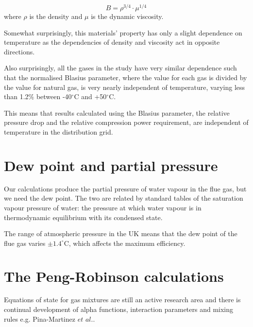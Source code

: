 \documentclass[5p]{elsarticle} %
\begin{document}
\begin{equation}
\label{eqn:defnb}
B = \rho^{3/4} \cdot \mu^{1/4} 
\end{equation}
where $\rho$ is the density and $\mu$ is the dynamic viscosity.

Somewhat surprisingly, this materials' property has only a slight dependence on temperature as the dependencies of density and viscosity act in opposite directions. 

Also surprisingly, all the gases in the study have very similar dependence such that the normalised Blasius parameter, where the value for each gas is divided by the value for natural gas, is very nearly independent of temperature, varying less than 1.2\% between -40$^\circ$C and +50$^\circ$C.


This means that results calculated using the Blasius parameter, the relative pressure drop and the relative compression power requirement, are independent of temperature in the distribution grid.

\section{Dew point and partial pressure}
\label{sec:partial pressure}
Our calculations produce the partial pressure of water vapour in the flue gas, but we need the dew point. The two are related by standard tables of the saturation vapour pressure of water\citep{Perry2008}: the pressure at which water vapour is in thermodynamic equilibrium with its condensed state.

The range of atmospheric pressure in the UK means that the dew point of the flue gas varies  $\pm1.4^\circ$C, which affects the maximum efficiency.

\section{The Peng-Robinson calculations}

Equations of state for gas mixtures are still an active research area\citep{Lozana2022} and there is continual development of alpha functions, interaction parameters and mixing rules e.g. Pina-Martinez $et$ $al.$\citep{Pina-Martinez2019}.
\end{document}
